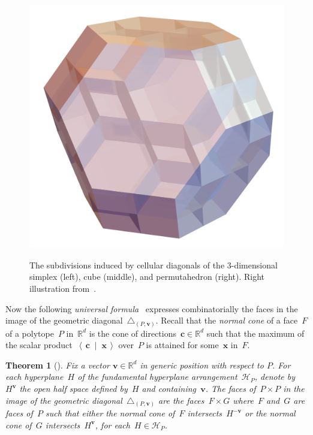 \documentclass{amsart}
\newcommand{\darkblue}{\color{darkblue}} %
\newtheorem{theorem}{Theorem}[section]
\theoremstyle{definition}
\newcommand{\R}{\mathbb{R}} %
\renewcommand{\b}[1]{{\boldsymbol{#1}}} %
\newcommand{\dotprod}[2]{\left\langle \, #1 \; \middle| \; #2 \, \right\rangle} %
\newcommand{\defn}[1]{\textsl{\darkblue #1}} %
\renewcommand{\b}[1]{\boldsymbol{#1}} %
\begin{document}
\begin{figure}
{		\includegraphics[scale=.3]{diagonalPermutahedronGuillaume.png}
	}
	\caption{The subdivisions induced by cellular diagonals of the $3$-dimensional simplex (left), cube (middle), and permutahedron (right). Right illustration from~\cite[Fig.~13]{LaplanteAnfossi}.}
	\label{fig:examplesDiagonals2}
\end{figure}

Now the following \defn{universal formula}~\cite[Thm.~1.26]{LaplanteAnfossi} expresses combinatorially the faces in the image of the geometric diagonal~$\triangle_{(P,\b{v})}$.
Recall that the \defn{normal cone} of a face~$F$ of a polytope~$P$ in~$\R^d$ is the cone of directions~$\b{c} \in \R^d$ such that the maximum of the scalar product~$\dotprod{\b{c}}{\b{x}}$ over~$P$ is attained for some~$\b{x}$ in~$F$.

\begin{theorem}[{\cite[Thm.~1.26]{LaplanteAnfossi}}]
\label{thm:universalFormula}
Fix a vector $\b{v} \in \R^d$ in generic position with respect to $P$.
For each hyperplane~$H$ of the fundamental hyperplane arrangement~$\mathcal{H}_P$, denote by~$H^{\b{v}}$ the open half space defined by~$H$ and containing~$\b{v}$.
The faces of~$P \times P$ in the image of the geometric diagonal~$\triangle_{(P,\b{v})}$ are the faces~$F \times G$ where~$F$ and~$G$ are faces of~$P$ such that either the normal cone of~$F$ intersects~$H^{-\b{v}}$ or the normal cone of~$G$ intersects~$H^{\b{v}}$, for each~$H \in \mathcal{H}_P$.
\end{theorem}
\end{document}
